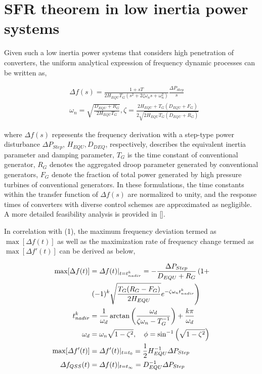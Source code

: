 \documentclass[lettersize,journal]{IEEEtran}
\begin{document}
\section{SFR theorem in low inertia power systems}

Given such a low inertia power systems that considers high penetration of converters, the uniform analytical expression of frequency dynamic processes can be written as,

\begin{subequations}
\begin{align}
  \!\!\!\!&\varDelta f(s) \!=\! \frac{1+sT}{2H_{EQU}T_{G}(s^2 + 2\zeta \omega_n s + \omega_n^2)}\frac{\varDelta P_{Step}}{s}\label{eq:Lsfr}\\
  \!\!\!\!&\omega_n \!=\! \sqrt{\!\frac{D_{EQU} \!+\! R_G}{2H_{EQU}T_G}}, \zeta \!=\! \frac{2H_{EQU}  \!+\! T_G(D_{EQU} \!+\! F_G)}{2\sqrt{2H_{EQU}T_G(D_{EQU} \!+\! R_G)}}
\end{align}
\end{subequations}

\noindent
where $\varDelta f(s)$ represents the frequency derivation with a step-type power disturbance $\varDelta P_{Step}$, $H_{EQU},\! D_{DEQ}$, respectively, describes the equivalent inertia parameter and damping parameter, $T_G$ is the time constant of conventional generator, $R_G$ denotes the aggregated droop parameter generated by conventional generators, $F_G$ denote the fraction of total power generated by high pressure turbines of conventional generators. In these formulations, the time constants within the transfer function of $\varDelta f(s)$ are normalized to unity, and the response times of converters with diverse control schemes are approximated as negligible. A more detailed feasibility analysis is provided in [].

In correlation with (1), the maximum frequency deviation termed as $\max[ \varDelta f(t)]$ as well as the maximization rate of frequency change termed as $\max[\varDelta f'(t)]$ can be derived as below,

\begin{subequations}
\begin{align}
    \max[\Delta f(t)] &= \varDelta f(t)|_{t=t_{nadir}^k} = -\frac{\Delta P_{Step}}{D_{EQU} + R_G} \left( 1 + \right.\notag \\
                      &\left. (-1)^k \sqrt{\frac{T_G(R_G - F_G)}{2H_{EQU}}} e^{-\zeta \omega_n t_{nadir}^k} \right) \label{eq:max_delta_f}\\
    t_{nadir}^k &= \frac{1}{\omega_d} \arctan \left( \frac{\omega_d}{\zeta \omega_n - T_G^{-1}} \right) + \frac{k\pi}{\omega_d}\notag  \\
    \omega_d &= \omega_n \sqrt{1 - \zeta^2}, \quad \phi = \sin^{-1} \left( \sqrt{1 - \zeta^2} \right) \notag\\
  \max[\varDelta f'(t)] &= \varDelta f'(t)|_{t=t_{0}} = \frac{1}{2} H_{EQU}^{-1}\varDelta P_{Step} \label{eq:max_rocof}\\
  \varDelta f_{QSS}(t) &= \varDelta f(t)|_{t=t_{\infty}} = {D_{EQU}^{-1}\varDelta P_{Step}} \label{eq:qss}
\end{align}
\end{subequations}
  
\end{document}
